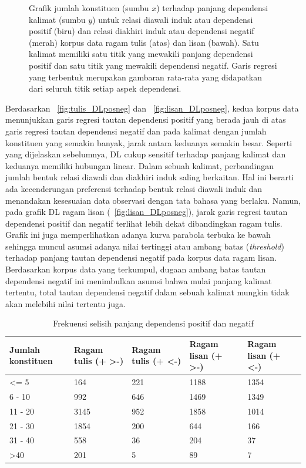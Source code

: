 \begin{figure}
\caption{Grafik jumlah konstituen (sumbu $x$) terhadap panjang dependensi kalimat (sumbu $y$) untuk relasi diawali induk atau dependensi positif (biru) dan relasi diakhiri induk atau dependensi negatif (merah) korpus data ragam tulis (atas) dan lisan (bawah). Satu kalimat memiliki satu titik yang mewakili panjang dependensi positif dan satu titik yang mewakili dependensi negatif. Garis regresi yang terbentuk merupakan gambaran rata-rata yang didapatkan dari seluruh titik setiap aspek dependensi.}
\label{fig:DL_posneg}
\end{figure}

Berdasarkan \pic~\ref{fig:tulis_DLposneg} dan \pic~\ref{fig:lisan_DLposneg}, kedua korpus data menunjukkan garis regresi tautan dependensi positif yang berada jauh di atas garis regresi tautan dependensi negatif dan pada kalimat dengan jumlah konstituen yang semakin banyak, jarak antara keduanya semakin besar. Seperti yang dijelaskan sebelumnya, DL cukup sensitif terhadap panjang kalimat dan keduanya memiliki hubungan linear. Dalam sebuah kalimat, perbandingan jumlah bentuk relasi diawali dan diakhiri induk saling berkaitan. Hal ini berarti ada kecenderungan preferensi terhadap bentuk relasi diawali induk dan menandakan kesesuaian data observasi dengan tata bahasa yang berlaku. Namun, pada grafik DL ragam lisan (\pic~\ref{fig:lisan_DLposneg}), jarak garis regresi tautan dependensi positif dan negatif terlihat lebih dekat dibandingkan ragam tulis. Grafik ini juga memperlihatkan adanya kurva parabola terbuka ke bawah sehingga muncul asumsi adanya nilai tertinggi atau ambang batas (\textit{threshold}) terhadap panjang tautan dependensi negatif pada korpus data ragam lisan. Berdasarkan korpus data yang terkumpul, dugaan ambang batas tautan dependensi negatif ini menimbulkan asumsi bahwa mulai panjang kalimat tertentu, total tautan dependensi negatif dalam sebuah kalimat mungkin tidak akan melebihi nilai tertentu juga. 

\begin{table}
\begin{center}
\begin{small}
\caption{Frekuensi selisih panjang dependensi positif dan negatif}  \label{tab:DLposneg}
\begin{tabular}{ | p{2cm} | p{2cm} | p{2cm} | p{2cm} | p{2cm} |}
\hline
Jumlah konstituen & Ragam tulis (+ \textgreater -) & Ragam tulis (+ \textless -) & Ragam lisan (+ \textgreater -) & Ragam lisan (+ \textless -) \\ \hline
\textless= 5 & 164 & 221 & 1188 & 1354 \\ \hline
6 - 10 & 992 & 646 &1469 & 1349 \\ \hline
11 - 20 & 3145 & 952 & 1858 & 1014 \\ \hline
21 - 30 & 1854 & 200 & 644 & 166 \\ \hline
31 - 40 & 558 & 36 & 204 & 37 \\ \hline
\textgreater 40 & 201 & 5 & 89 & 7 \\ \hline
 \end{tabular}
 \end{small}
 \end{center}
 \end{table}
 
